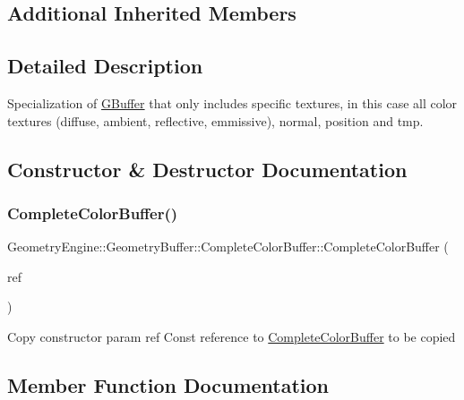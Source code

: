 \subsection*{Additional Inherited Members}


\subsection{Detailed Description}
Specialization of \mbox{\hyperlink{class_geometry_engine_1_1_geometry_buffer_1_1_g_buffer}{G\+Buffer}} that only includes specific textures, in this case all color textures (diffuse, ambient, reflective, emmissive), normal, position and tmp. 

\subsection{Constructor \& Destructor Documentation}
\mbox{\label{class_geometry_engine_1_1_geometry_buffer_1_1_complete_color_buffer_ad1b8c2aed3b0c6154836275c91964a5a}} 
\subsubsection{\texorpdfstring{CompleteColorBuffer()}{CompleteColorBuffer()}}
{\footnotesize\ttfamily Geometry\+Engine\+::\+Geometry\+Buffer\+::\+Complete\+Color\+Buffer\+::\+Complete\+Color\+Buffer (\begin{DoxyParamCaption}\item[{const \mbox{\hyperlink{class_geometry_engine_1_1_geometry_buffer_1_1_complete_color_buffer}{Complete\+Color\+Buffer}} \&}]{ref }\end{DoxyParamCaption})}

Copy constructor param ref Const reference to \mbox{\hyperlink{class_geometry_engine_1_1_geometry_buffer_1_1_complete_color_buffer}{Complete\+Color\+Buffer}} to be copied 

\subsection{Member Function Documentation}
\mbox{\label{class_geometry_engine_1_1_geometry_buffer_1_1_complete_color_buffer_a56aee74c7523f0b16fd8b97c8c44f84f}} 
